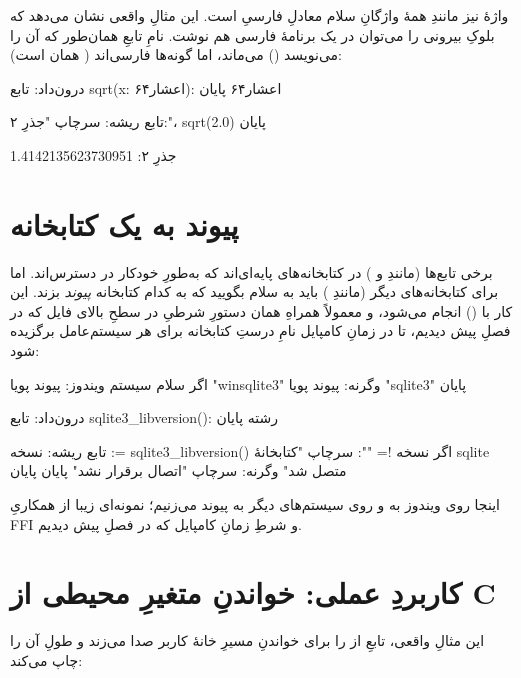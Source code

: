 واژهٔ  نیز مانندِ همهٔ واژگانِ سلام معادلِ فارسیِ
 است. این مثالِ واقعی نشان می‌دهد که بلوکِ بیرونی را می‌توان در یک
برنامهٔ فارسی هم نوشت. نامِ تابعِ  همان‌طور که  آن را می‌نویسد
() می‌ماند، اما گونه‌ها فارسی‌اند ( همان 
است):

\begin{salamfa}
درون‌داد:
    تابع sqrt(x: اعشار۶۴): اعشار۶۴
پایان

تابع ریشه:
    سرچاپ "جذرِ ۲:"، sqrt(2.0)
پایان
\end{salamfa}

\begin{progoutfa}
جذرِ ۲: 1.4142135623730951
\end{progoutfa}

\section{پیوند به یک کتابخانه}

برخی تابع‌ها (مانندِ  و ) در کتابخانه‌های پایه‌ای‌اند که
به‌طورِ خودکار در دسترس‌اند. اما برای کتابخانه‌های دیگر (مانندِ )
باید به سلام بگویید که به کدام کتابخانه \emph{پیوند} بزند. این کار با
 () انجام می‌شود، و معمولاً همراهِ همان
دستورِ شرطیِ  در سطحِ بالای فایل که در فصلِ پیش دیدیم، تا در زمانِ
کامپایل نامِ درستِ کتابخانه برای هر سیستم‌عامل برگزیده شود:

\begin{salamfa}
اگر سلام سیستم ویندوز:
    پیوند پویا "winsqlite3"
وگرنه:
    پیوند پویا "sqlite3"
پایان

درون‌داد:
    تابع sqlite3_libversion(): رشته
پایان

تابع ریشه:
    نسخه := sqlite3_libversion()
    اگر نسخه != "":
        سرچاپ "کتابخانهٔ sqlite متصل شد"
    وگرنه:
        سرچاپ "اتصال برقرار نشد"
    پایان
پایان
\end{salamfa}

اینجا روی ویندوز به  و روی سیستم‌های دیگر به 
پیوند می‌زنیم؛ نمونه‌ای زیبا از همکاریِ FFI و شرطِ زمانِ کامپایل که در فصلِ پیش
دیدیم.

\section{کاربردِ عملی: خواندنِ متغیرِ محیطی از C}

این مثالِ واقعی، تابعِ  از  را برای خواندنِ مسیرِ خانهٔ
کاربر صدا می‌زند و طولِ آن را چاپ می‌کند:

